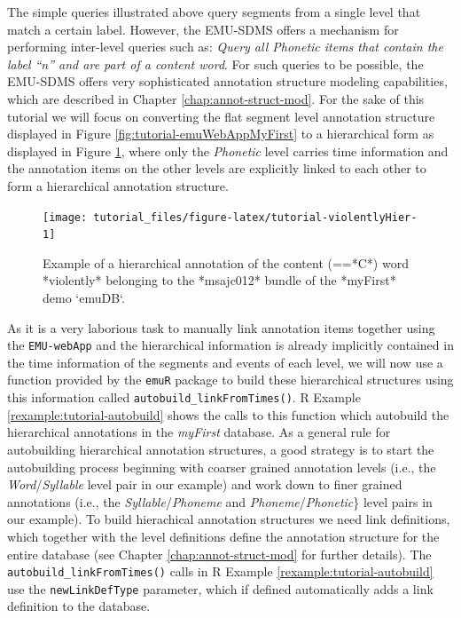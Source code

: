 \documentclass[]{book}
\theoremstyle{definition}
\theoremstyle{definition}
\theoremstyle{definition}
\theoremstyle{remark}
\begin{document}
The simple queries illustrated above query segments from a single level
that match a certain label. However, the EMU-SDMS offers a mechanism for
performing inter-level queries such as: \emph{Query all Phonetic items
that contain the label ``n'' and are part of a content word}. For such
queries to be possible, the EMU-SDMS offers very sophisticated
annotation structure modeling capabilities, which are described in
Chapter \ref{chap:annot-struct-mod}. For the sake of this tutorial we
will focus on converting the flat segment level annotation structure
displayed in Figure \ref{fig:tutorial-emuWebAppMyFirst} to a
hierarchical form as displayed in Figure
\ref{fig:tutorial-violentlyHier}, where only the \emph{Phonetic} level
carries time information and the annotation items on the other levels
are explicitly linked to each other to form a hierarchical annotation
structure.

\begin{figure}

{\centering \texttt{[image: tutorial\_files/figure-latex/tutorial-violentlyHier-1]} 

}

\caption{Example of a hierarchical annotation of the content (==*C*) word *violently* belonging to the *msajc012* bundle of the *myFirst* demo `emuDB`.}\label{fig:tutorial-violentlyHier}
\end{figure}

As it is a very laborious task to manually link annotation items
together using the \texttt{EMU-webApp} and the hierarchical information
is already implicitly contained in the time information of the segments
and events of each level, we will now use a function provided by the
\texttt{emuR} package to build these hierarchical structures using this
information called \texttt{autobuild\_linkFromTimes()}. R Example
\ref{rexample:tutorial-autobuild} shows the calls to this function which
autobuild the hierarchical annotations in the \emph{myFirst} database.
As a general rule for autobuilding hierarchical annotation structures, a
good strategy is to start the autobuilding process beginning with
coarser grained annotation levels (i.e., the \emph{Word}/\emph{Syllable}
level pair in our example) and work down to finer grained annotations
(i.e., the \emph{Syllable}/\emph{Phoneme} and
\emph{Phoneme}/\emph{Phonetic}\} level pairs in our example). To build
hierachical annotation structures we need link definitions, which
together with the level definitions define the annotation structure for
the entire database (see Chapter \ref{chap:annot-struct-mod} for further
details). The \texttt{autobuild\_linkFromTimes()} calls in R Example
\ref{rexample:tutorial-autobuild} use the \texttt{newLinkDefType}
parameter, which if defined automatically adds a link definition to the
database.
\end{document}
